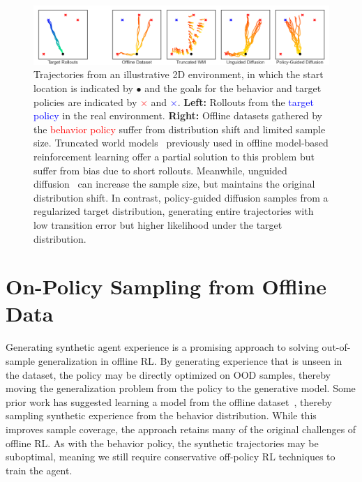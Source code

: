 \documentclass[10pt]{article} %
\theoremstyle{plain}
\theoremstyle{definition}
\theoremstyle{remark}
\begin{document}
\begin{figure}[t!]
\centering
\vspace{-2mm}
\includegraphics[width=\textwidth]{figs/boxes.png}
\vspace{-4mm}
\caption{
Trajectories from an illustrative 2D environment, in which the start location is indicated by $\bullet$ and the goals for the behavior and target policies are indicated by \textcolor{red}{$\mathbf{\times}$} and \textcolor{blue}{$\mathbf{\times}$}.
\textbf{Left:} Rollouts from the \textcolor{blue}{target policy} in the real environment.
\textbf{Right:} 
Offline datasets gathered by the \textcolor{red}{behavior policy} suffer from distribution shift and limited sample size.
Truncated world models~\citep{mopo, kidambi2020morel} previously used in offline model-based reinforcement learning offer a partial solution to this problem but suffer from bias due to short rollouts.
Meanwhile, unguided diffusion~\citep{lu2023synthetic} can increase the sample size, but maintains the original distribution shift.
In contrast, policy-guided diffusion samples from a regularized target distribution, generating entire trajectories with low transition error but higher likelihood under the target distribution.
}
\label{fig:teaser}
\end{figure}




\section{On-Policy Sampling from Offline Data}


Generating synthetic agent experience is a promising approach to solving out-of-sample generalization in offline RL.
By generating experience that is unseen in the dataset, the policy may be directly optimized on OOD samples, thereby moving the generalization problem from the policy to the generative model.
Some prior work has suggested learning a model from the offline dataset~\citep{lu2023synthetic}, thereby sampling synthetic experience from the behavior distribution.
While this improves sample coverage, the approach retains many of the original challenges of offline RL.
As with the behavior policy, the synthetic trajectories may be suboptimal, meaning we still require conservative off-policy RL techniques to train the agent.
\end{document}
